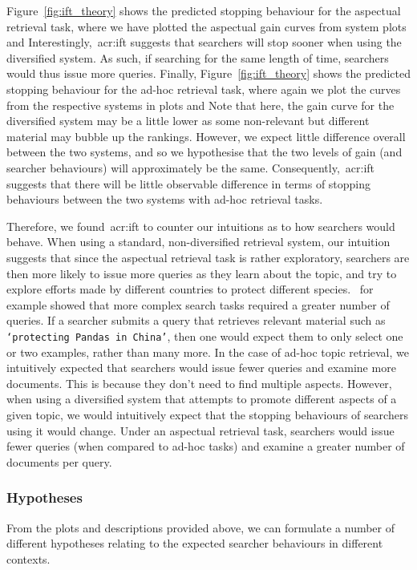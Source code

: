 Figure~\ref{fig:ift_theory}  shows the predicted stopping behaviour for the aspectual retrieval task, where we have plotted the aspectual gain curves from system plots  and  Interestingly,~\gls{acr:ift} suggests that searchers will stop sooner when using the diversified system. As such, if searching for the same length of time, searchers would thus issue more queries. Finally, Figure~\ref{fig:ift_theory}  shows the predicted stopping behaviour for the ad-hoc retrieval task, where again we plot the curves from the respective systems in plots  and  Note that here, the gain curve for the diversified system may be a little lower as some non-relevant but different material may bubble up the rankings. However, we expect little difference overall between the two systems, and so we hypothesise that the two levels of gain (and searcher behaviours) will approximately be the same. Consequently,~\gls{acr:ift} suggests that there will be little observable difference in terms of stopping behaviours between the two systems with ad-hoc retrieval tasks.

Therefore, we found~\gls{acr:ift} to counter our intuitions as to how searchers would behave. When using a standard, non-diversified retrieval system, our intuition suggests that since the aspectual retrieval task is rather exploratory, searchers are then more likely to issue more queries as they learn about the topic, and try to explore efforts made by different countries to protect different species.~\cite{kelly2015search_tasks} for example showed that more complex search tasks required a greater number of queries. If a searcher submits a query that retrieves relevant material such as \texttt{`protecting Pandas in China'}, then one would expect them to only select one or two examples, rather than many more. In the case of ad-hoc topic retrieval, we intuitively expected that searchers would issue fewer queries and examine more documents. This is because they don't need to find multiple aspects. However, when using a diversified system that attempts to promote different aspects of a given topic, we would intuitively expect that the stopping behaviours of searchers using it would change. Under an aspectual retrieval task, searchers would issue fewer queries (when compared to ad-hoc tasks) and examine a greater number of documents per query.

\subsubsection{Hypotheses}\label{sec:diversity:background:tasks:hypotheses}
From the plots and descriptions provided above, we can formulate a number of different hypotheses relating to the expected searcher behaviours in different contexts.

